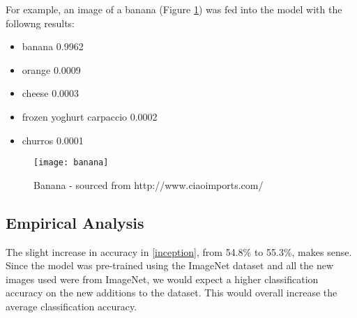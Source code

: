 For example, an image of a banana (Figure \ref{fig:banana}) was fed into the model with
the followng results:
\begin{itemize}
    \item{banana 0.9962}
    \item{orange 0.0009}
    \item{cheese 0.0003}
    \item{frozen yoghurt carpaccio 0.0002}
    \item{churros 0.0001}
\end{itemize}
 
\begin{figure}
    \texttt{[image: banana]}
    \caption{Banana - sourced from http://www.ciaoimports.com/}
    \label{fig:banana}
\end{figure}

\subsection*{Empirical Analysis}
The slight increase in accuracy in \ref{inception}, from 54.8\% to 55.3\%, makes
sense. Since the model was pre-trained using the ImageNet dataset and all the
new images used were from ImageNet, we would expect a higher classification
accuracy on the new additions to the dataset. This would overall increase the
average classification accuracy.
